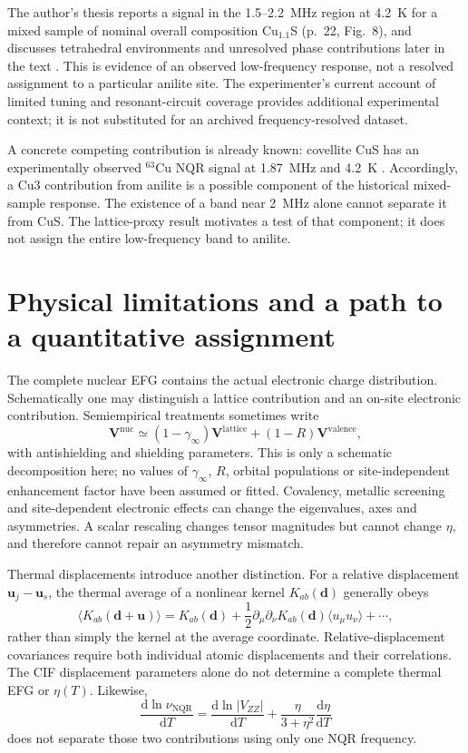 \documentclass[11pt,a4paper]{article}
\newcommand{\dd}{\mathrm d}
\newcommand{\V}{\bm V}
\newcommand{\nunqr}{\nu_{\mathrm{NQR}}}
\begin{document}
The author's thesis reports a signal in the 1.5--2.2~MHz region at 4.2~K for a
mixed sample of nominal overall composition Cu$_{1.1}$S (p.~22, Fig.~8), and
discusses tetrahedral environments and unresolved phase contributions later in
the text \cite{Thesis}. This is evidence of an observed low-frequency response,
not a resolved assignment to a particular anilite site. The experimenter's
current account of limited tuning and resonant-circuit coverage provides
additional experimental context; it is not substituted for an archived
frequency-resolved dataset.

A concrete competing contribution is already known: covellite CuS has an
experimentally observed $^{63}$Cu NQR signal at 1.87~MHz and 4.2~K
\cite{Gainov2009}. Accordingly, a Cu3 contribution from anilite is a possible
component of the historical mixed-sample response. The existence of a band near
2~MHz alone cannot separate it from CuS. The lattice-proxy result motivates a
test of that component; it does not assign the entire low-frequency band to
anilite.

\section{Physical limitations and a path to a quantitative assignment}

The complete nuclear EFG contains the actual electronic charge distribution.
Schematically one may distinguish a lattice contribution and an on-site
electronic contribution. Semiempirical treatments sometimes write \cite{Gainov2009}
\begin{equation}
 \V^{\mathrm{nuc}}\simeq(1-\gamma_\infty)\V^{\mathrm{lattice}}
 +(1-R)\V^{\mathrm{valence}},
\end{equation}
with antishielding and shielding parameters. This is only a schematic
decomposition here; no values of $\gamma_\infty$, $R$, orbital populations or
site-independent enhancement factor have been assumed or fitted. Covalency,
metallic screening and site-dependent electronic effects can change the
eigenvalues, axes and asymmetries. A scalar rescaling changes tensor magnitudes
but cannot change $\eta$, and therefore cannot repair an asymmetry mismatch.

Thermal displacements introduce another distinction. For a relative
displacement $\bm u_j-\bm u_s$, the thermal average of a nonlinear kernel
$K_{ab}(\bm d)$ generally obeys
\begin{equation}
 \langle K_{ab}(\bm d+\bm u)\rangle
 =K_{ab}(\bm d)+\frac12\partial_\mu\partial_\nu K_{ab}(\bm d)
 \langle u_\mu u_\nu\rangle+\cdots,
\end{equation}
rather than simply the kernel at the average coordinate. Relative-displacement
covariances require both individual atomic displacements and their correlations.
The CIF displacement parameters alone do not determine a complete thermal EFG
or $\eta(T)$. Likewise,
\begin{equation}
 \frac{\dd\ln\nunqr}{\dd T}
 =\frac{\dd\ln|V_{ZZ}|}{\dd T}
 +\frac{\eta}{3+\eta^2}\frac{\dd\eta}{\dd T}
\end{equation}
does not separate those two contributions using only one NQR frequency.
\end{document}
